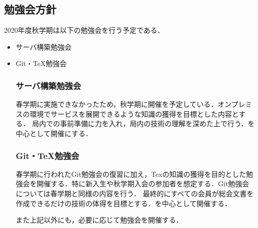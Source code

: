 \subsection*{勉強会方針}


2020年度秋学期は以下の勉強会を行う予定である．
\begin{itemize}
	\item サーバ構築勉強会
	\item Git・TeX勉強会
\subsubsection*{サーバ構築勉強会}
春学期に実施できなかったため，秋学期に開催を予定している．オンプレミスの環境でサービスを展開できるような知識の獲得を目標とした内容とする．
局内での事前準備に力を入れ，局内の技術の理解を深めた上で行う．\secondGrade{}を中心として開催にする．
\subsubsection*{Git・TeX勉強会}
春学期に行われたGit勉強会の復習に加え，Texの知識の獲得を目的とした勉強会を開催する．特に新入生や秋学期入会の参加者を想定する．Git勉強会については春学期と同様の内容を行う．
最終的にすべての会員が総会文書を作成できるだけの技術の体得を目標とする．\secondGrade{}を中心として開催する．

また上記以外にも，必要に応じて勉強会を開催する．
\end{itemize}
